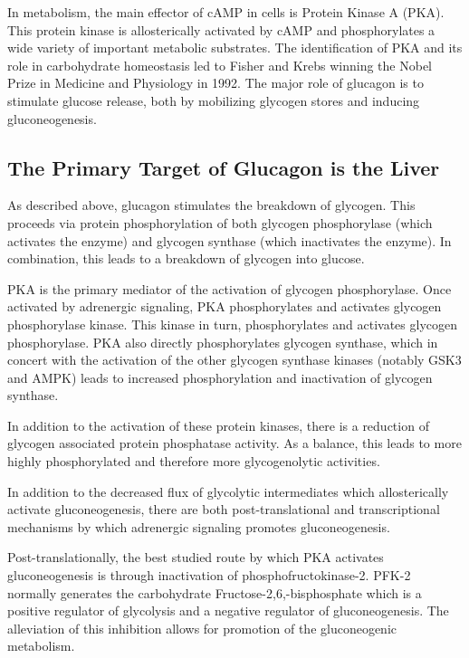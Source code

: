 \documentclass{tufte-handout}
\begin{document}
In metabolism, the main effector of cAMP in cells is Protein Kinase A (PKA).  This protein kinase is allosterically activated by cAMP and phosphorylates a wide variety of important metabolic substrates.  The identification of PKA and its role in carbohydrate homeostasis led to Fisher and Krebs winning the Nobel Prize in Medicine and Physiology in 1992.  The major role of glucagon is to stimulate glucose release, both by mobilizing glycogen stores and inducing gluconeogenesis.

\subsection{The Primary Target of Glucagon is the Liver}

As described above, glucagon stimulates the breakdown of glycogen.  This proceeds via protein phosphorylation of both glycogen phosphorylase (which activates the enzyme) and glycogen synthase (which inactivates the enzyme).  In combination, this leads to a breakdown of glycogen into glucose.

PKA is the primary mediator of the activation of glycogen phosphorylase.  Once activated by adrenergic signaling, PKA phosphorylates and activates glycogen phosphorylase kinase.  This kinase in turn, phosphorylates and activates glycogen phosphorylase\cite{Krebs1956}.  PKA also directly phosphorylates glycogen synthase, which in concert with the activation of the other glycogen synthase kinases (notably GSK3 and AMPK) leads to increased phosphorylation and inactivation of glycogen synthase.

In addition to the activation of these protein kinases, there is a reduction of glycogen associated protein phosphatase activity.  As a balance, this leads to more highly phosphorylated and therefore more glycogenolytic activities.

  In addition to the decreased flux of glycolytic intermediates which allosterically activate gluconeogenesis, there are both post-translational and transcriptional mechanisms by which adrenergic signaling promotes gluconeogenesis.  

Post-translationally, the best studied route by which PKA activates gluconeogenesis is through inactivation of phosphofructokinase-2.  PFK-2 normally generates the carbohydrate Fructose-2,6,-bisphosphate which is a positive regulator of glycolysis and a negative regulator of gluconeogenesis.  The alleviation of this inhibition allows for promotion of the gluconeogenic metabolism.  
\end{document}
